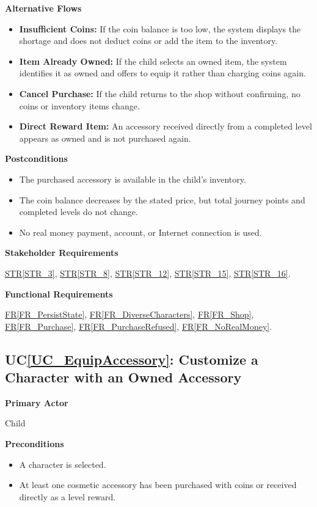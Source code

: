 \documentclass[10pt]{article}
\newcommand{\strref}[1]{\hyperref[#1]{STR\ref*{#1}}}
\newcounter{ucnum} %
\newcommand{\ucheading}[1]{UC\ref*{#1}}
\newcommand{\rref}[1]{\hyperref[#1]{FR\ref*{#1}}}
\begin{document}
\textbf{Alternative Flows}
\begin{itemize}
    \item \textbf{Insufficient Coins:} If the coin balance is too low,
    the system displays the shortage and does not deduct coins
    or add the item to the inventory.
    \item \textbf{Item Already Owned:} If the child selects an owned
    item, the system identifies it as owned and offers to equip
    it rather than charging coins again.
    \item \textbf{Cancel Purchase:} If the child returns to the shop
    without confirming, no coins or inventory items change.
    \item \textbf{Direct Reward Item:} An accessory received directly
    from a completed level appears as owned and is not purchased again.
\end{itemize}

\textbf{Postconditions}
\begin{itemize}
    \item The purchased accessory is available in the child's inventory.
    \item The coin balance decreases by the stated price, but total
    journey points and completed levels do not change.
    \item No real money payment, account, or Internet connection is used.
\end{itemize}

\textbf{Stakeholder Requirements}

\strref{STR_3}, \strref{STR_8}, \strref{STR_12}, \strref{STR_15}, \strref{STR_16}.

\textbf{Functional Requirements}

\rref{FR_PersistState}, \rref{FR_DiverseCharacters}, \rref{FR_Shop}, \rref{FR_Purchase}, \rref{FR_PurchaseRefused}, \rref{FR_NoRealMoney}.

\label{UC_EquipAccessory}
\subsection{\ucheading{UC_EquipAccessory}: Customize a Character with an Owned Accessory}

\textbf{Primary Actor}

Child

\textbf{Preconditions}
\begin{itemize}
    \item A character is selected.
    \item At least one cosmetic accessory has been purchased
    with coins or received directly as a level reward.
\end{itemize}
\end{document}
